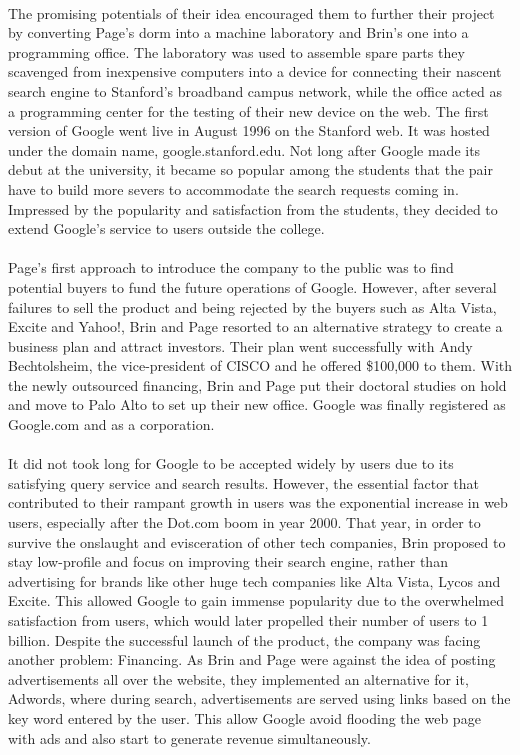 \documentclass[12pt]{article}
\begin{document}
\paragraph{}
The promising potentials of their idea encouraged them to further their project by converting Page's dorm into a machine laboratory and Brin's one into a programming office. The laboratory was used to assemble spare parts they scavenged from inexpensive computers into a device for connecting their nascent search engine to Stanford's broadband campus network, while the office acted as a programming center for the testing of their new device on the web. The first version of Google went live in August 1996 on the Stanford web. It was hosted under the domain name, google.stanford.edu. Not long after Google made its debut at the university, it became so popular among the students that the pair have to build more severs to accommodate the search requests coming in. Impressed by the popularity and satisfaction from the students, they decided to extend Google's service to users outside the college. 
\paragraph{}
Page's first approach to introduce the company to the public was to find potential buyers to fund the future operations of Google. However, after several failures to sell the product and being rejected by the buyers such as Alta Vista, Excite and Yahoo!, Brin and Page resorted to an alternative strategy to create a business plan and attract investors. Their plan went successfully with Andy Bechtolsheim, the vice-president of CISCO and he offered \$100,000 to them. With the newly outsourced financing, Brin and Page put their doctoral studies on hold and move to Palo Alto to set up their new office. Google was finally registered as Google.com and as a corporation. 

\paragraph{}
It did not took long for Google to be accepted widely by users due to its satisfying query service and search results. However, the essential factor that contributed to their rampant growth in users was the exponential increase in web users, especially after the Dot.com boom in year 2000. That year, in order to survive the onslaught and evisceration of other tech companies, Brin proposed to stay low-profile and focus on improving their search engine, rather than advertising for brands like other huge tech companies like Alta Vista, Lycos and Excite. This allowed Google to gain immense popularity due to the overwhelmed satisfaction from users, which would later propelled their number of users to 1 billion. Despite the successful launch of the product, the company was facing another problem: Financing. As Brin and Page were against the idea of posting advertisements all over the website, they implemented an alternative for it, Adwords, where during search, advertisements are served using links based on the key word entered by the user. This allow Google avoid flooding the web page with ads and also start to generate revenue simultaneously. 
\end{document}
